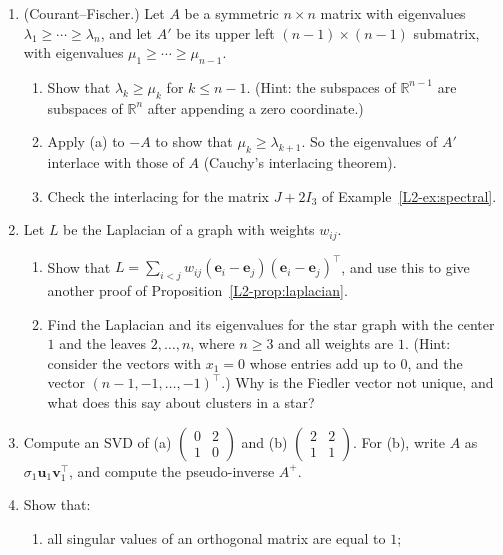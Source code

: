 \begin{enumerate}[leftmargin=*]
\begin{enumerate}
    \end{enumerate}
    \item (Courant--Fischer.) Let $A$ be a symmetric $n \times n$ matrix with eigenvalues $\lambda_1 \geq \cdots \geq \lambda_n$, and let $A'$ be its upper left $(n - 1) \times (n - 1)$ submatrix, with eigenvalues $\mu_1 \geq \cdots \geq \mu_{n-1}$.
    \begin{enumerate}
        \item Show that $\lambda_k \geq \mu_k$ for $k \leq n - 1$. (Hint: the subspaces of $\mathbb{R}^{n-1}$ are subspaces of $\mathbb{R}^n$ after appending a zero coordinate.)
        \item Apply (a) to $-A$ to show that $\mu_k \geq \lambda_{k+1}$. So the eigenvalues of $A'$ interlace with those of $A$ (Cauchy's interlacing theorem).
        \item Check the interlacing for the matrix $J + 2I_3$ of Example~\ref{L2-ex:spectral}.
    \end{enumerate}
    \item Let $L$ be the Laplacian of a graph with weights $w_{ij}$.
    \begin{enumerate}
        \item Show that $L = \sum_{i < j} w_{ij}(\mathbf{e}_i - \mathbf{e}_j)(\mathbf{e}_i - \mathbf{e}_j)^\top$, and use this to give another proof of Proposition~\ref{L2-prop:laplacian}.
        \item Find the Laplacian and its eigenvalues for the star graph with the center $1$ and the leaves $2, \ldots, n$, where $n \geq 3$ and all weights are $1$. (Hint: consider the vectors with $x_1 = 0$ whose entries add up to $0$, and the vector $(n - 1, -1, \ldots, -1)^\top$.) Why is the Fiedler vector not unique, and what does this say about clusters in a star?
    \end{enumerate}
    \item \homework{} Compute an SVD of (a) $\begin{pmatrix} 0 & 2 \\ 1 & 0 \end{pmatrix}$ and (b) $\begin{pmatrix} 2 & 2 \\ 1 & 1 \end{pmatrix}$. For (b), write $A$ as $\sigma_1 \mathbf{u}_1 \mathbf{v}_1^\top$, and compute the pseudo-inverse $A^+$.
    \item Show that:
    \begin{enumerate}[label=(\alph*)]
        \item all singular values of an orthogonal matrix are equal to $1$;

\end{enumerate}
\end{enumerate}
